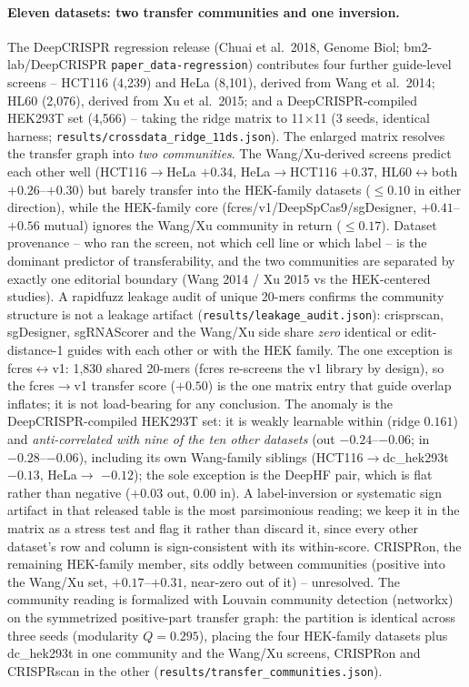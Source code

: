 \documentclass[12pt]{article}
\begin{document}
\paragraph{Eleven datasets: two transfer communities and one inversion.}
The DeepCRISPR regression release (Chuai et al.\ 2018, Genome Biol;
bm2-lab/DeepCRISPR \texttt{paper\_data-regression}) contributes four
further guide-level screens -- HCT116 (4,239) and HeLa (8,101), derived
from Wang et al.\ 2014; HL60 (2,076), derived from Xu et al.\ 2015; and a
DeepCRISPR-compiled HEK293T set (4,566) -- taking the ridge matrix to
11${\times}$11 (3 seeds, identical harness;
\texttt{results/crossdata\_ridge\_11ds.json}). The enlarged matrix
resolves the transfer graph into \emph{two communities}. The
Wang/Xu-derived screens predict each other well (HCT116$\to$HeLa
$+0.34$, HeLa$\to$HCT116 $+0.37$, HL60$\leftrightarrow$both
$+0.26$--$+0.30$) but barely transfer into the HEK-family datasets
(${\le}0.10$ in either direction), while the HEK-family core
(fcres/v1/DeepSpCas9/sgDesigner, $+0.41$--$+0.56$ mutual) ignores the
Wang/Xu community in return (${\le}0.17$). Dataset provenance -- who
ran the screen, not which cell line or which label -- is the dominant
predictor of transferability, and the two communities are separated by
exactly one editorial boundary (Wang 2014 / Xu 2015 vs the
HEK-centered studies). A rapidfuzz leakage audit of unique 20-mers
confirms the community structure is not a leakage artifact
(\texttt{results/leakage\_audit.json}): crisprscan, sgDesigner,
sgRNAScorer and the Wang/Xu side share \emph{zero} identical or
edit-distance-1 guides with each other or with the HEK family. The one
exception is fcres$\leftrightarrow$v1: 1{,}830 shared 20-mers (fcres
re-screens the v1 library by design), so the fcres$\to$v1 transfer score
($+0.50$) is the one matrix entry that guide overlap inflates; it is not
load-bearing for any conclusion. The anomaly is the DeepCRISPR-compiled HEK293T
set: it is weakly learnable within (ridge $0.161$) and
\emph{anti-correlated with nine of the ten other datasets} (out
$-0.24$--$-0.06$; in $-0.28$--$-0.06$), including its own Wang-family
siblings (HCT116$\to$dc\_hek293t $-0.13$, HeLa$\to$ $-0.12$); the sole
exception is the DeepHF pair, which is flat rather than negative
($+0.03$ out, $0.00$ in). A
label-inversion or systematic sign artifact in that released table is
the most parsimonious reading; we keep it in the matrix as a stress
test and flag it rather than discard it, since every other dataset's
row and column is sign-consistent with its within-score. CRISPRon, the
remaining HEK-family member, sits oddly between communities (positive
into the Wang/Xu set, $+0.17$--$+0.31$, near-zero out of it) --
unresolved. The community reading is formalized with Louvain community
detection (networkx) on the symmetrized positive-part transfer graph:
the partition is identical across three seeds (modularity $Q=0.295$),
placing the four HEK-family datasets plus dc\_hek293t in one community
and the Wang/Xu screens, CRISPRon and CRISPRscan in the other
(\texttt{results/transfer\_communities.json}).
\end{document}
